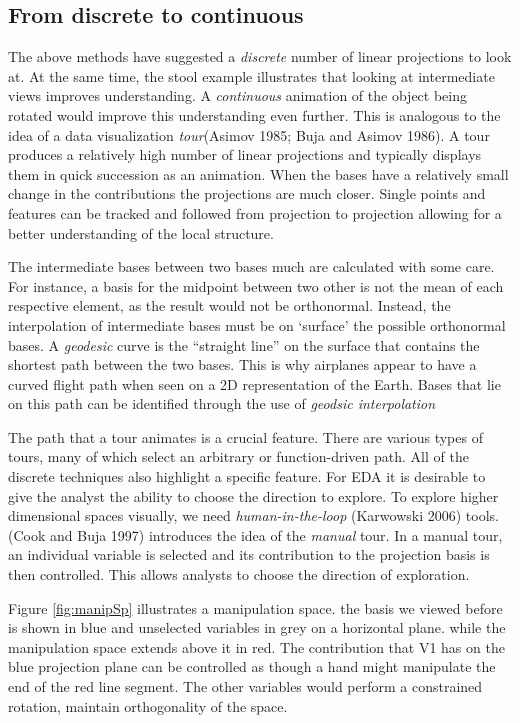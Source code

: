 \documentclass[
  11,
]{article}
\begin{document}
\hypertarget{from-discrete-to-continuous}{%
\subsection{From discrete to continuous}\label{from-discrete-to-continuous}}

The above methods have suggested a \emph{discrete} number of linear projections to look at. At the same time, the stool example illustrates that looking at intermediate views improves understanding. A \emph{continuous} animation of the object being rotated would improve this understanding even further. This is analogous to the idea of a data visualization \emph{tour}(Asimov 1985; Buja and Asimov 1986). A tour produces a relatively high number of linear projections and typically displays them in quick succession as an animation. When the bases have a relatively small change in the contributions the projections are much closer. Single points and features can be tracked and followed from projection to projection allowing for a better understanding of the local structure.

The intermediate bases between two bases much are calculated with some care. For instance, a basis for the midpoint between two other is not the mean of each respective element, as the result would not be orthonormal. Instead, the interpolation of intermediate bases must be on `surface' the possible orthonormal bases. A \emph{geodesic} curve is the ``straight line'' on the surface that contains the shortest path between the two bases. This is why airplanes appear to have a curved flight path when seen on a 2D representation of the Earth. Bases that lie on this path can be identified through the use of \emph{geodsic interpolation}

The path that a tour animates is a crucial feature. There are various types of tours, many of which select an arbitrary or function-driven path. All of the discrete techniques also highlight a specific feature. For EDA it is desirable to give the analyst the ability to choose the direction to explore. To explore higher dimensional spaces visually, we need \emph{human-in-the-loop} (Karwowski 2006) tools. (Cook and Buja 1997) introduces the idea of the \emph{manual} tour. In a manual tour, an individual variable is selected and its contribution to the projection basis is then controlled. This allows analysts to choose the direction of exploration.

Figure \ref{fig:manipSp} illustrates a manipulation space. the basis we viewed before is shown in blue and unselected variables in grey on a horizontal plane. while the manipulation space extends above it in red. The contribution that V1 has on the blue projection plane can be controlled as though a hand might manipulate the end of the red line segment. The other variables would perform a constrained rotation, maintain orthogonality of the space.
\end{document}
